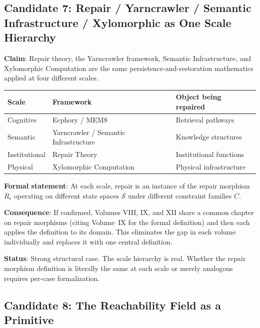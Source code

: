 \documentclass[11pt, a4paper]{article}
\begin{document}
\subsection{Candidate 7: Repair / Yarncrawler / Semantic Infrastructure / Xylomorphic as One Scale Hierarchy}

\begin{candbox}
\textbf{Claim}: Repair theory, the Yarncrawler framework, Semantic
Infrastructure, and Xylomorphic Computation are the same
persistence-and-restoration mathematics applied at four different scales.

\medskip
\begin{tabular}{lll}
\textbf{Scale} & \textbf{Framework} & \textbf{Object being repaired} \\
\hline
Cognitive & Ecphory / MEM\textbar{}8 & Retrieval pathways \\
Semantic & Yarncrawler / Semantic Infrastructure & Knowledge structures \\
Institutional & Repair Theory & Institutional functions \\
Physical & Xylomorphic Computation & Physical infrastructure \\
\end{tabular}

\medskip
\textbf{Formal statement}: At each scale, repair is an instance of
the repair morphism $R_\epsilon$ operating on different state spaces
$\mathcal{S}$ under different constraint families $C$.

\medskip
\textbf{Consequence}: If confirmed, Volumes VIII, IX, and XII share
a common chapter on repair morphisms (citing Volume~IX for the formal
definition) and then each applies the definition to its domain.
This eliminates the gap in each volume individually and replaces it
with one central definition.

\medskip
\textbf{Status}: Strong structural case. The scale hierarchy is
real. Whether the repair morphism definition is literally the same
at each scale or merely analogous requires per-case formalization.
\end{candbox}

\subsection{Candidate 8: The Reachability Field as a Primitive}
\end{document}
